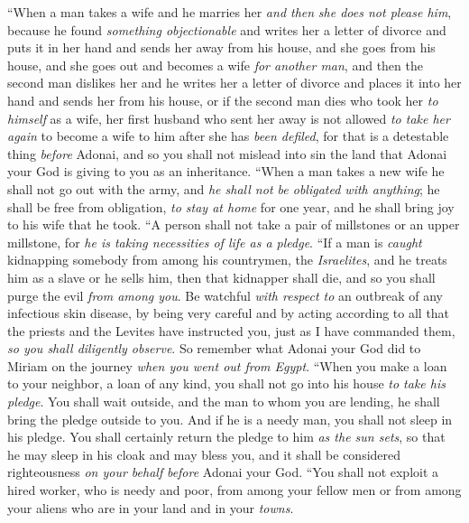 \begin{biblechapter} %
\verse “When a man takes a wife and he marries her \textit{and then} \textit{she does not please him}, because he found \textit{something objectionable} and writes her a letter of divorce and puts it in her hand and sends her away from his house,
\verse and she goes from his house, and she goes out and becomes a wife \textit{for another man},
\verse and then the second man dislikes her and he writes her a letter of divorce and places it into her hand and sends her from his house, or if the second man dies who took her \textit{to himself} as a wife,
\verse her first husband who sent her away is not allowed \textit{to take her again} to become a wife to him after she has \textit{been defiled}, for that is a detestable thing \textit{before} Adonai, and so you shall not mislead into sin the land that Adonai your God is giving to you as an inheritance.
\verse “When a man takes a new wife he shall not go out with the army, and \textit{he shall not be obligated with anything}; he shall be free from obligation, \textit{to stay at home} for one year, and he shall bring joy to his wife that he took.
\verse “A person shall not take a pair of millstones or an upper millstone, for \textit{he is taking necessities of life as a pledge}.
\verse “If a man is \textit{caught} kidnapping somebody from among his countrymen, the \textit{Israelites}, and he treats him as a slave or he sells him, then that kidnapper shall die, and so you shall purge the evil \textit{from among you}.
\verse Be watchful \textit{with respect to} an outbreak of any infectious skin disease, by being very careful and by acting according to all that the priests and the Levites have instructed you, just as I have commanded them, \textit{so you shall diligently observe}.
\verse So remember what Adonai your God did to Miriam on the journey \textit{when you went out from Egypt}.
\verse “When you make a loan to your neighbor, a loan of any kind, you shall not go into his house \textit{to take his pledge}.
\verse You shall wait outside, and the man to whom you are lending, he shall bring the pledge outside to you.
\verse And if he is a needy man, you shall not sleep in his pledge.
\verse You shall certainly return the pledge to him \textit{as the sun sets}, so that he may sleep in his cloak and may bless you, and it shall be considered righteousness \textit{on your behalf} \textit{before} Adonai your God.
\verse “You shall not exploit a hired worker, who is needy and poor, from among your fellow men or from among your aliens who are in your land and in your \textit{towns}.

\end{biblechapter}
